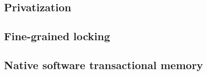 \subsection{Privatization}

\subsection{Fine-grained locking}

\subsection{Native software transactional memory}
